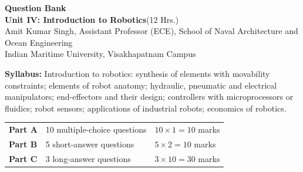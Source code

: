 \documentclass[11pt,a4paper]{article}
\begin{document}
	\begin{center}
		{\Large\bfseries\color{cAccent} Question Bank}\\[4pt]
		{\large\bfseries Unit IV: Introduction to Robotics}\quad(12 Hrs.)\\[6pt]
		{\small Amit Kumar Singh, Assistant Professor (ECE), School of Naval Architecture and Ocean Engineering\\
			Indian Maritime University, Visakhapatnam Campus}
	\end{center}

	\noindent\textbf{Syllabus:} Introduction to robotics: synthesis of elements with movability constraints; elements of robot anatomy; hydraulic, pneumatic and electrical manipulators; end-effectors and their design; controllers with microprocessors or fluidics; robot sensors; applications of industrial robots; economics of robotics.

	\medskip
	\noindent
	\begin{tabular}{@{}lll@{}}
		\textbf{Part A} & 10 multiple-choice questions & $10\times1 = 10$ marks \\
		\textbf{Part B} & 5 short-answer questions      & $5\times2 = 10$ marks \\
		\textbf{Part C} & 3 long-answer questions       & $3\times10 = 30$ marks \\
	\end{tabular}
\end{document}
